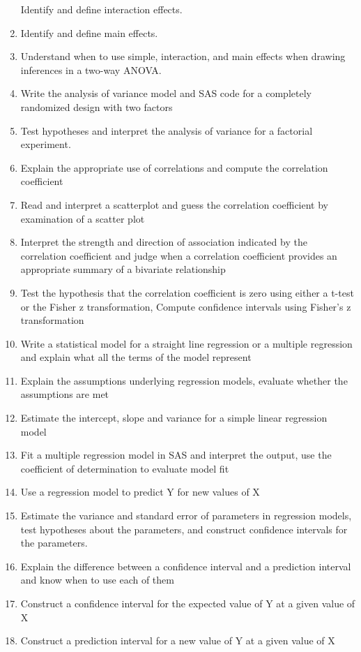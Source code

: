 \documentclass[
]{book}
\theoremstyle{definition}
\theoremstyle{definition}
\theoremstyle{definition}
\theoremstyle{remark}
\begin{document}
\begin{enumerate}
  Identify and define interaction effects.
\item
  Identify and define main effects.
\item
  Understand when to use simple, interaction, and main effects when drawing inferences in a two-way ANOVA.
\item
  Write the analysis of variance model and SAS code for a completely randomized design with two factors
\item
  Test hypotheses and interpret the analysis of variance for a factorial experiment.
\item
  Explain the appropriate use of correlations and compute the correlation coefficient
\item
  Read and interpret a scatterplot and guess the correlation coefficient by examination of a scatter plot
\item
  Interpret the strength and direction of association indicated by the correlation coefficient and judge when a correlation coefficient provides an appropriate summary of a bivariate relationship
\item
  Test the hypothesis that the correlation coefficient is zero using either a t-test or the Fisher z transformation, Compute confidence intervals using Fisher's z transformation
\item
  Write a statistical model for a straight line regression or a multiple regression and explain what all the terms of the model represent
\item
  Explain the assumptions underlying regression models, evaluate whether the assumptions are met
\item
  Estimate the intercept, slope and variance for a simple linear regression model
\item
  Fit a multiple regression model in SAS and interpret the output, use the coefficient of determination to evaluate model fit
\item
  Use a regression model to predict Y for new values of X
\item
  Estimate the variance and standard error of parameters in regression models, test hypotheses about the parameters, and construct confidence intervals for the parameters.
\item
  Explain the difference between a confidence interval and a prediction interval and know when to use each of them
\item
  Construct a confidence interval for the expected value of Y at a given value of X
\item
  Construct a prediction interval for a new value of Y at a given value of X

\end{enumerate}
\end{document}
